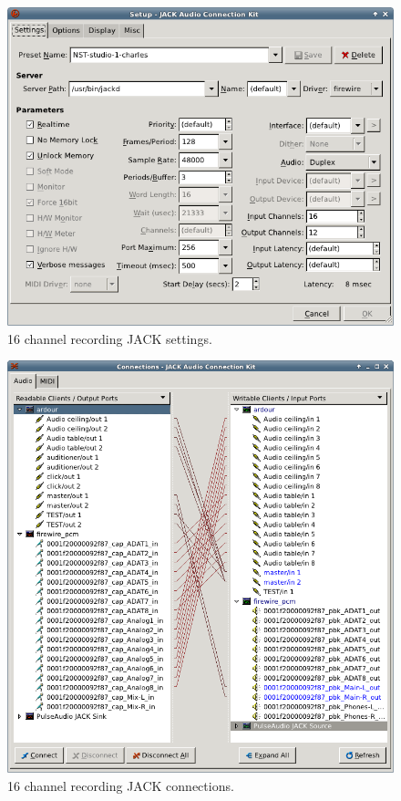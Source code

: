 \documentclass[oneside,english]{scrbook}
\begin{document}
\begin{figure}
  \centering
  \includegraphics[width=\columnwidth]{figs/jack-settings.png}
  \caption{16 channel recording JACK settings.}
  \label{fig:jack-settings}
\end{figure}

\begin{figure}
  \centering
  \includegraphics[width=\columnwidth]{figs/jack-connect.png}
  \caption{16 channel recording JACK connections.}
  \label{fig:jack-connect}
\end{figure}
\end{document}
